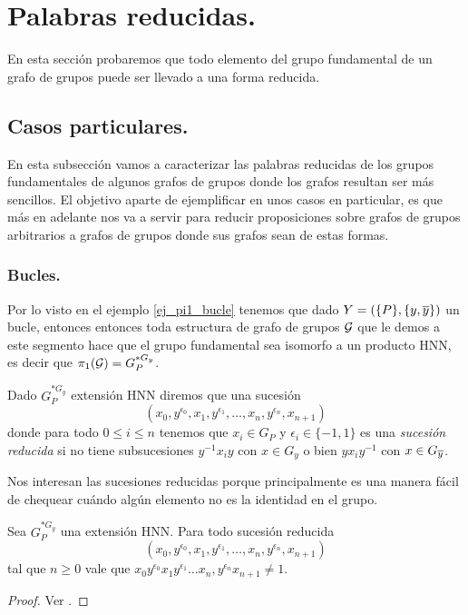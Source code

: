 \documentclass[tesis.tex]{subfiles}
\begin{document}
\section{Palabras reducidas.}\label{secc_palab_reds}

En esta sección probaremos que todo elemento del grupo fundamental de un grafo de grupos puede ser llevado a una forma reducida.

\subsection{Casos particulares.}

En esta subsección vamos a caracterizar las palabras reducidas de los grupos fundamentales de algunos grafos de grupos donde los grafos resultan ser más sencillos.
El objetivo aparte de ejemplificar en unos casos en particular, es que más en adelante nos va a servir para reducir proposiciones sobre grafos de grupos arbitrarios a grafos de grupos donde sus grafos sean de estas formas.

\subsubsection{Bucles.}\label{subsub_bucle}
Por lo visto en el ejemplo \ref{ej_pi1_bucle} tenemos que dado $Y = (\{P\}, \{y,\overline y\})$ un bucle, entonces entonces toda estructura de grafo de grupos ${\cal G}$ que le demos a este segmento 
hace que el grupo fundamental sea isomorfo a un producto HNN, es decir que $\pi_1({\cal G}) = G_P^{\ast G_y}$. 

\begin{deff}\label{deff_hnn_fn}
	Dado $G_P^{\ast G_y}$ extensión HNN diremos que una sucesión
	\[
		(x_{0},y^{\epsilon_0},x_{1},y^{\epsilon_1}, \dots, x_{n},y^{\epsilon_n},x_{n+1})
	\]
	donde para todo $0 \le i \le n$ tenemos que $x_{i} \in G_{P}$ y $\epsilon_{i} \in \{ -1,1 \}$
	es una \emph{sucesión reducida} si no tiene subsucesiones 
	$y^{-1}x_iy$ con $x \in G_{y}$ o bien $yx_iy^{-1}$ con $x \in G_{\overline y}$.	
\end{deff}

Nos interesan las sucesiones reducidas porque principalmente es una manera fácil de chequear cuándo algún elemento no es la identidad en el grupo.

\begin{prop}[Britton]\label{teo_britton}
	Sea $G_P^{\ast G_y}$ una extensión HNN.
	Para todo sucesión reducida
	\[
	(x_{0},y^{\epsilon_0},x_{1},y^{\epsilon_1}, \dots, x_{n},y^{\epsilon_n},x_{n+1})
	\]
	tal que $n \ge 0$
	vale que $x_{0}y^{\epsilon_0}x_{1}y^{\epsilon_1} \dots x_{n},y^{\epsilon_n}x_{n+1} \neq 1$.
\end{prop}
\begin{proof}
	Ver \cite[p.182]{lyndon1977combinatorial}.
\end{proof}
\end{document}
